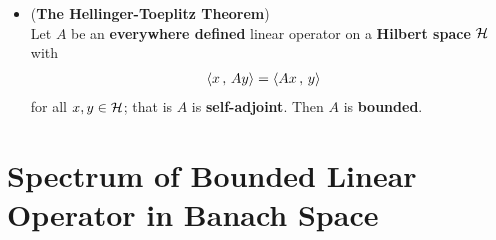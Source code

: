 \documentclass[11pt]{article}
\begin{document}
\begin{itemize}
\item \begin{corollary}(\textbf{The Hellinger-Toeplitz Theorem}) \citep{reed1980methods} \\
Let $A$ be an \textbf{everywhere defined} linear operator on a \textbf{Hilbert space} ${\mathcal H}$ with
\begin{align*}
\left\langle x\,,\, Ay \right\rangle &= \left\langle Ax\,,\, y \right\rangle
\end{align*} for all $x, y \in {\mathcal H}$; that is $A$ is \textbf{self-adjoint}. Then $A$ is \textbf{bounded}. 
\end{corollary}
\end{itemize}

\section{Spectrum of Bounded Linear Operator in Banach Space}
\end{document}
